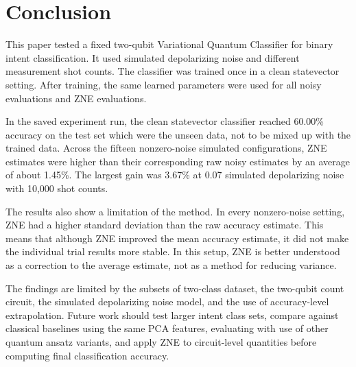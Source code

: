 \documentclass[conference]{IEEEtran}
\begin{document}
\section{Conclusion}

This paper tested a fixed two-qubit Variational Quantum Classifier for binary
intent classification. It used simulated depolarizing noise and different
measurement shot counts. The classifier was trained once in a clean
statevector setting. After training, the same learned parameters were used for
all noisy evaluations and ZNE evaluations.

In the saved experiment run, the clean statevector classifier reached 60.00\%
accuracy on the test set which were the unseen data, not to be mixed up with the trained data. 
Across the fifteen nonzero-noise simulated configurations, 
ZNE estimates were higher than their corresponding raw
noisy estimates by an average of about 1.45\%. The largest gain
was 3.67\% at 0.07 simulated depolarizing noise with 10{,}000 shot counts.

The results also show a limitation of the method. In every nonzero-noise setting,
ZNE had a higher standard deviation than the raw accuracy estimate. This means
that although ZNE improved the mean accuracy estimate, it did not make the
individual trial results more stable. In this setup, ZNE is better understood as
a correction to the average estimate, not as a method for reducing variance.

The findings are limited by the subsets of two-class dataset, the two-qubit count circuit, the
simulated depolarizing noise model, and the use of accuracy-level extrapolation. 
Future work should test larger intent class sets, compare against
classical baselines using the same PCA features, evaluating with use of other quantum ansatz
variants, and apply ZNE to circuit-level quantities before computing final
classification accuracy.
\end{document}

